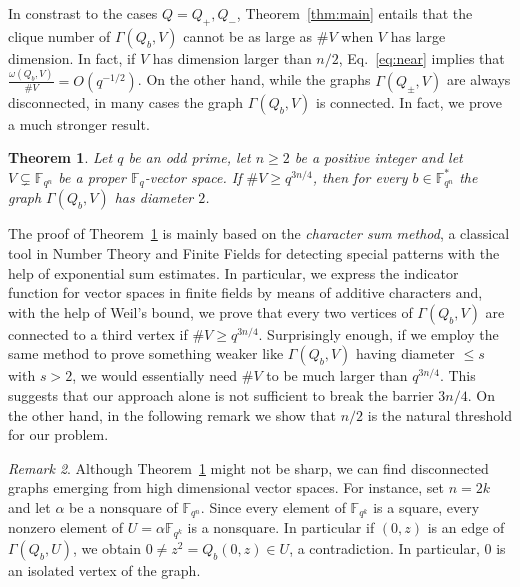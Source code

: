 \documentclass[11pt]{amsart}
\newcommand{\G}{\Gamma}
\newcommand{\F}{\mathbb F}
\newtheorem{theorem}{Theorem}[section]
\theoremstyle{definition}
\theoremstyle{remark}
\newtheorem{remark}[theorem]{Remark}
\begin{document}
     In constrast to the cases $Q=Q_+, Q_-$, Theorem~\ref{thm:main} entails that the clique number of $\G(Q_b, V)$ cannot be as large as $\# V$ when $V$ has large dimension. In fact, if $V$ has dimension larger than $n/2$, Eq.~\eqref{eq:near}  implies that $\frac{\omega(Q_b, V)}{\# V}=O(q^{-1/2})$. On the other hand, while the graphs $\G(Q_{\pm}, V)$ are always disconnected, in many cases the graph $\G(Q_b, V)$ is connected. In fact, we prove a much stronger result.

     \begin{theorem}\label{thm:diam}
         Let $q$ be an odd prime, let $n\ge 2$ be a positive integer and let $V\subsetneq \F_{q^n}$ be a proper $\F_q$-vector space. If  $\# V\ge q^{3n/4}$, then for every $b\in \F_{q^n}^*$ the graph $\G(Q_b, V)$ has diameter $2$. 
     \end{theorem}

The proof of Theorem~\ref{thm:diam} is mainly based on the {\em character sum method}, a classical tool in Number Theory and Finite Fields for detecting special patterns with the help of exponential sum estimates. In particular, we express the indicator function for vector spaces in finite fields by means of additive characters and, with the help of Weil's bound, we prove that every two vertices of $\G(Q_b, V)$ are connected to a third vertex if $\# V\ge q^{3n/4}$. Surprisingly enough, if we employ the same method to prove something weaker like $\Gamma(Q_b, V)$ having diameter $\le s$ with $s>2$, we would essentially need $\# V$ to be much larger than $q^{3n/4}$. This suggests that our approach alone is not sufficient to break the barrier $3n/4$. On the other hand, in the following remark we show that $n/2$ is the natural threshold for our problem.  

\begin{remark}\label{rem:disc}
    Although Theorem~\ref{thm:diam} might not be sharp, we can find disconnected graphs emerging from high dimensional vector spaces. For instance, set $n=2k$ and let $\alpha$ be a nonsquare of $\F_{q^n}$. Since every element of $\F_{q^k}$ is a square, every nonzero element of $U=\alpha\F_{q^k}$ is a nonsquare. In particular if $(0, z)$ is an edge of $\Gamma(Q_b, U)$, we obtain $0\ne z^2=Q_b(0, z)\in U$, a contradiction. In particular, $0$ is an isolated vertex of the graph.
\end{remark}




 
\end{document}
